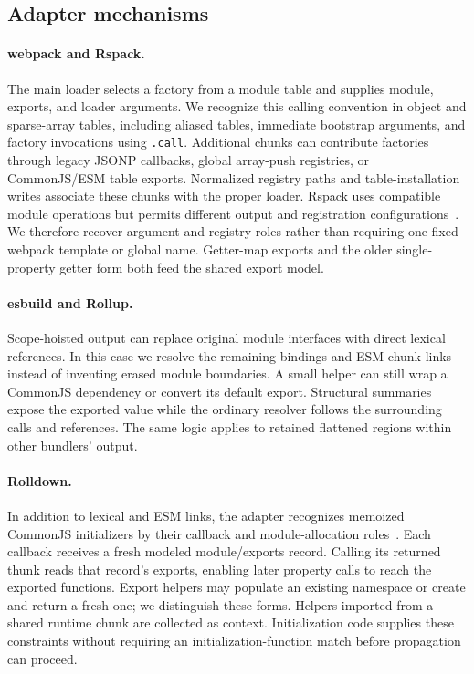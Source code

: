 \subsection{Adapter mechanisms}
\paragraph{webpack and Rspack.}
The main loader selects a factory from a module table and supplies module, exports, and loader arguments. We recognize this calling convention in object and sparse-array tables, including aliased tables, immediate bootstrap arguments, and factory invocations using \texttt{.call}. Additional chunks can contribute factories through legacy JSONP callbacks, global array-push registries, or CommonJS/ESM table exports. Normalized registry paths and table-installation writes associate these chunks with the proper loader. Rspack uses compatible module operations but permits different output and registration configurations~\cite{webpackManifest,rspackOutput}. We therefore recover argument and registry roles rather than requiring one fixed webpack template or global name. Getter-map exports and the older single-property getter form both feed the shared export model.

\paragraph{esbuild and Rollup.}
Scope-hoisted output can replace original module interfaces with direct lexical references. In this case we resolve the remaining bindings and ESM chunk links instead of inventing erased module boundaries. A small helper can still wrap a CommonJS dependency or convert its default export. Structural summaries expose the exported value while the ordinary resolver follows the surrounding calls and references. The same logic applies to retained flattened regions within other bundlers' output.

\paragraph{Rolldown.}
In addition to lexical and ESM links, the adapter recognizes memoized CommonJS initializers by their callback and module-allocation roles~\cite{rolldownRuntime}. Each callback receives a fresh modeled module/exports record. Calling its returned thunk reads that record's exports, enabling later property calls to reach the exported functions. Export helpers may populate an existing namespace or create and return a fresh one; we distinguish these forms. Helpers imported from a shared runtime chunk are collected as context. Initialization code supplies these constraints without requiring an initialization-function match before propagation can proceed.

